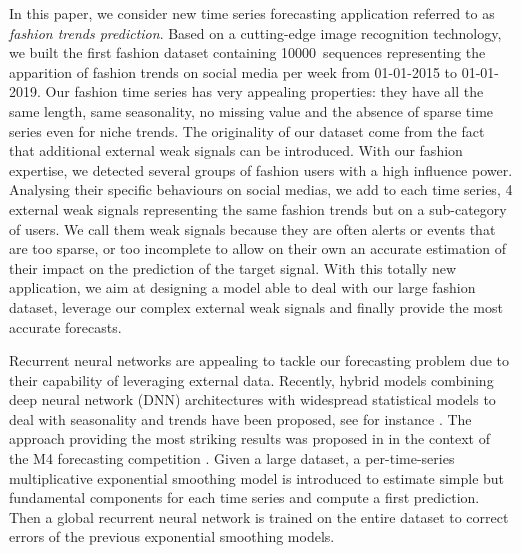 \documentclass{article} %
\newcommand{\numberts}{10000}
\begin{document}
In this paper, we consider  new time series forecasting application referred to as {\em fashion trends prediction}. Based on a cutting-edge image recognition technology, we built the first fashion dataset containing \numberts\ sequences representing the apparition of fashion trends on social media per week from 01-01-2015 to 01-01-2019. Our fashion time series has very appealing properties: they have all the same length, same seasonality, no missing value and the absence of sparse time series even for niche trends. The originality of our dataset come from the fact that additional external weak signals can be introduced. With our fashion expertise, we detected several groups of fashion users with a high influence power. Analysing their specific behaviours on social medias, we add to each time series, 4 external weak signals representing the same fashion trends but on a sub-category of users. We call them weak signals because they are often alerts or events that are too sparse, or too incomplete to allow on their own an accurate estimation of their impact on the prediction of the target signal. With this totally new application, we aim at designing a model able to deal with our large fashion dataset, leverage our complex external weak signals and finally provide the most accurate forecasts.
 
Recurrent neural networks are appealing to tackle our forecasting problem due to their capability of leveraging external data.  Recently, hybrid models combining deep neural network (DNN) architectures with widespread statistical models to deal with seasonality and trends have been proposed, see for instance  \citep{zhang2003time,jianwei2019novel,bandara2020lstm}. The approach providing the most striking results was proposed in  \citep{smyl2020hybrid} in the context of the M4 forecasting competition \citep{makridakis2020m4}.  Given a large dataset, a per-time-series multiplicative exponential smoothing model is introduced to estimate simple but fundamental components for each time series and compute a first prediction. Then a global recurrent neural network is trained on the entire dataset to correct errors of the previous exponential smoothing models. %
\end{document}
